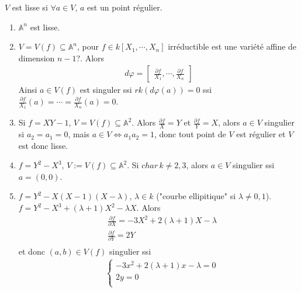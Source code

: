         \begin{defi}
            $V$ est lisse si $\forall a \in V$, $a$ est un point régulier.
        \end{defi}
        \begin{expl}
            \begin{enumerate}
                \item $\mathbb{A}^n$ est lisse.
                \item $V = V(f) \subseteq \mathbb{A}^n$, pour $f \in k[X_1, \cdots, X_n]$ irréductible est une variété affine de dimension $n-1$?. Alors
                \begin{align*}
                    d \varphi =
                    \begin{bmatrix}
                        \frac{\partial f}{X_1}, \cdots, \frac{\partial f}{X_n}
                    \end{bmatrix}
                \end{align*}
                Ainsi $a \in V(f)$ est singuler ssi $rk (d \varphi(a)) = 0$ ssi $\frac{\partial f}{X_1}(a) = \cdots = \frac{\partial f}{X_n}(a) = 0$.
                \item Si $f = XY - 1$, $V = V(f) \subseteq \mathbb{A}^2$. Alors $\frac{\partial f}{X} = Y$ et $\frac{\partial f}{Y} = X$, alors $a \in V$ singulier si $a_2 = a_1 = 0$, mais $a \in V \iff a_1a_2 = 1$, donc tout point de $V$ est régulier et $V$ est donc lisse.
                \item $f = Y^2 - X^3$, $V := V(f) \subseteq \mathbb{A}^2$. Si $char \, k \neq 2,3$, alors $a \in V$ singulier ssi $a = (0,0)$. 
                \item $f = Y^2 - X(X-1)(X - \lambda)$, $\lambda \in k$ ("courbe ellipitique" si $\lambda \neq 0,1$). $f = Y^2 - X^3 + (\lambda + 1)X^2 - \lambda X$. Alors
                \begin{align*}
                    & \frac{\partial f}{\partial X} = -3X^2 + 2(\lambda + 1)X - \lambda \\
                    & \frac{\partial f}{\partial Y} = 2Y \\
                \end{align*}
                et donc $(a,b) \in V(f)$ singulier ssi
                \begin{align*}
                    &\begin{cases}
                    -3x^2 + 2(\lambda + 1)x - \lambda = 0 \\
                    2y = 0 \\

\end{cases}
\end{align*}
\end{enumerate}
\end{expl}
